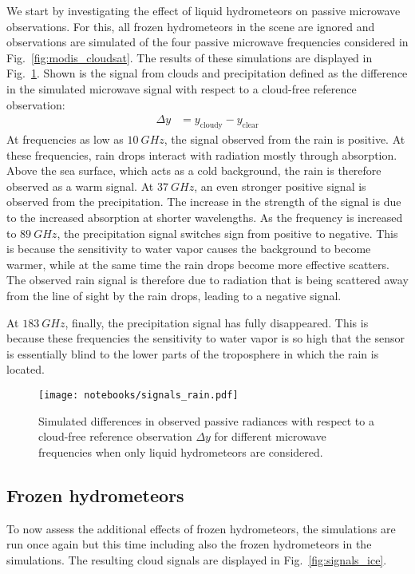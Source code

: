 We start by investigating the effect of liquid hydrometeors on passive microwave
observations. For this, all frozen hydrometeors in the scene are ignored and
observations are simulated of the four passive microwave frequencies considered
in Fig.~\ref{fig:modis_cloudsat}. The results of these simulations are displayed
in Fig.~\ref{fig:signals_rain}. Shown is the signal from clouds and precipitation
defined as the difference in the simulated microwave signal with respect to a cloud-free
reference observation:
\begin{align}
  \Delta y &= y_\text{cloudy} - y_\text{clear}
\end{align}
At frequencies as low as $10\ \unit{GHz}$, the signal observed from the rain is positive.
At these frequencies, rain drops interact with radiation mostly through absorption. Above
the sea surface, which acts as a cold background, the rain is therefore observed as a
warm signal. At $37\ \unit{GHz}$, an even stronger positive signal is observed from the
precipitation. The increase in the strength of the signal is due to the increased absorption
at shorter wavelengths.
As the frequency is increased to $89\ \unit{GHz}$, the precipitation signal switches sign
from  positive to negative. This is because  the sensitivity to water vapor
causes the background to become warmer, while at the same time the rain drops become
more effective scatters. The observed rain signal is therefore due to radiation that is being
scattered away from the line of sight by the rain drops, leading to a negative signal.

At $183\ \unit{GHz}$, finally, the precipitation signal has fully disappeared.
This is because these frequencies the sensitivity to water vapor is so high that
the sensor is essentially blind to the lower parts of the troposphere in which
the rain is located.

\begin{figure}
\texttt{[image: notebooks/signals\_rain.pdf]}
\caption{Simulated differences in observed passive radiances with respect to a
  cloud-free reference observation $\Delta y$ for different microwave
  frequencies when only liquid hydrometeors are considered.}
\label{fig:signals_rain}
\end{figure}

\subsection{Frozen hydrometeors}

To now assess the additional effects of frozen hydrometeors, the simulations are run once
again but this time including also the frozen hydrometeors in the simulations. The resulting
cloud signals are displayed in Fig.~\ref{fig:signals_ice}.

